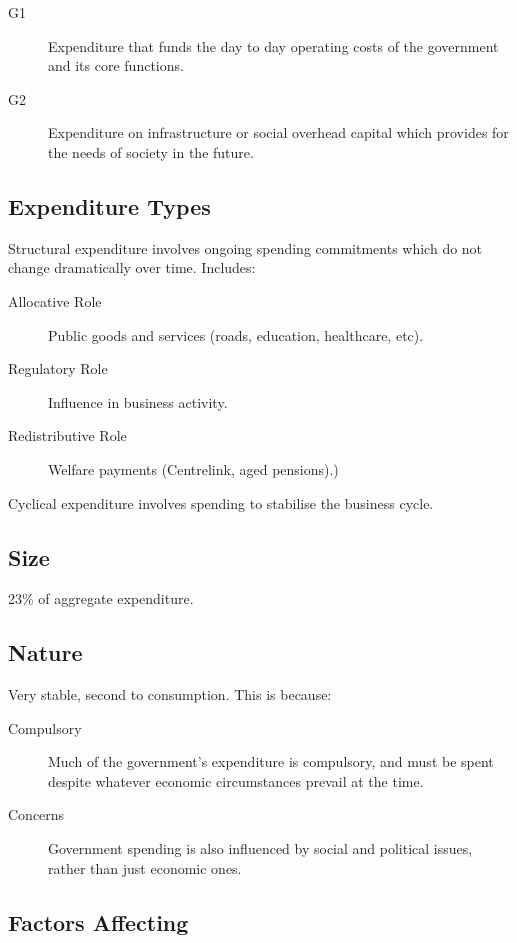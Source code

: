 \documentclass[a4paper,11pt]{report}
\begin{document}
\begin{description}
\item [G1] Expenditure that funds the day to day operating costs of the
	government and its core functions.
\item [G2] Expenditure on infrastructure or social overhead capital which
	provides for the needs of society in the future.
\end{description}

\subsection{Expenditure Types}

Structural expenditure involves ongoing spending commitments which do not
change dramatically over time. Includes:

\begin{description}
\item [Allocative Role] Public goods and services (roads, education, healthcare,
	etc).
\item [Regulatory Role] Influence in business activity.
\item [Redistributive Role] Welfare payments (Centrelink, aged pensions).)
\end{description}

Cyclical expenditure involves spending to stabilise the business cycle.

\subsection{Size}

23\% of aggregate expenditure.

\subsection{Nature}

Very stable, second to consumption. This is because:

\begin{description}
\item [Compulsory] Much of the government's expenditure is compulsory, and must
	be spent despite whatever economic circumstances prevail at the time.
\item [Concerns] Government spending is also influenced by social and political
	issues, rather than just economic ones.
\end{description}

\subsection{Factors Affecting}
\end{document}
